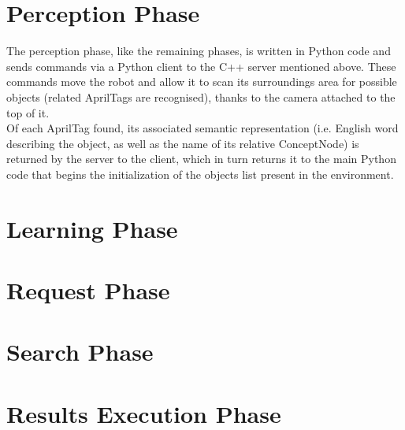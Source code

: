 \section{Perception Phase}\label{sec:perception}

The perception phase, like the remaining phases, is written in Python code and sends commands via a Python client to the C++ server mentioned above. These commands move the robot and allow it to scan its surroundings area for possible objects (related AprilTags are recognised), thanks to the camera attached to the top of it. \\
Of each AprilTag found, its associated semantic representation (i.e. English word describing the object, as well as the name of its relative ConceptNode) is returned by the server to the client, which in turn returns it to the main Python code that begins the initialization of the objects list present in the environment.

\section{Learning Phase}\label{sec:learning}


\section{Request Phase}\label{sec:request}


\section{Search Phase}\label{sec:search}


\section{Results Execution Phase}\label{sec:results_exec}